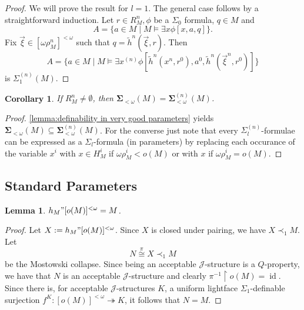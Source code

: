 \documentclass[12pt,a4paper]{article}
\theoremstyle{nicestyle}
\newtheorem{lemma}{Lemma}[subsection]
\newtheorem{corollary}{Corollary}[subsection]
\DeclareMathOperator{\id}{id}
\begin{document}
\begin{proof}
  We will prove the result for $l = 1$. The general case follows by a
  straightforward induction. Let $r \in R^{n}_{M}, \phi$ be a
  $\Sigma_{0}$ formula, $q \in M$ and
  \[
    A = \{ a \in M \mid M \models \exists x \phi[x,a,q] \}.
  \]
  Fix $\vec{\xi} \in [\omega \rho^{n}_{M}]^{<\omega}$ such that
  $q = \tilde{h}^{n}(\vec{\xi}, r)$. Then
  \[
    A = \{ a \in M \mid M \models \exists x^{(n)} \phi [
    \tilde{h}^{n}(x^{n}, r^{0}), a^{0}, \tilde{h}^{n}(\vec{\xi}^{n},
    r^{0})] \}
  \]
  is $\Sigma^{(n)}_{1}(M)$.
\end{proof}

\begin{corollary}
  If $R^{n}_{M} \neq \emptyset$, then
  $\boldsymbol{\Sigma}_{< \omega}(M) = \boldsymbol{\Sigma}^{(n)}_{<
    \omega}(M)$.
\end{corollary}

\begin{proof}
  \autoref{lemma:definability in very good parameters} yields
  $\boldsymbol{\Sigma}_{< \omega}(M) \subseteq
  \boldsymbol{\Sigma}^{(n)}_{< \omega}(M)$. For the converse just note
  that every $\Sigma^{(n)}_{l}$-formulae can be expressed as a
  $\Sigma_{l}$-formula (in parameters) by replacing each occurance of
  the variable $x^{i}$ with $x \in H^{i}_{M}$ if
  $\omega\rho^{i}_{M} < o(M)$ or with $x$ if
  $\omega \rho^{i}_{M} = o(M)$.
\end{proof}

\subsection{Standard Parameters}

\begin{lemma}
  $h_{M}" [o(M)]^{< \omega} = M$.
\end{lemma}

\begin{proof}
  Let $X := h_{M}" [o(M)]^{<\omega}$. Since $X$ is closed under
  pairing, we have $X \prec_{1} M$. Let
  \[
    N \overset{\pi}{\cong} X \prec_{1} M
  \]
  be the Mostowski collapse. Since being an acceptable
  $\mathcal{J}$-structure is a $Q$-property, we have that $N$ is an
  acceptable $\mathcal{J}$-structure and clearly
  $\pi^{-1} \restriction o(M) = \id$. Since there is, for acceptable
  $\mathcal{J}$-structures $K$, a uniform lightface
  $\Sigma_{1}$-definable surjection
  $f^{K} \colon [o(M)]^{<\omega} \twoheadrightarrow K$, it follows
  that $N = M$.
\end{proof}
\end{document}
